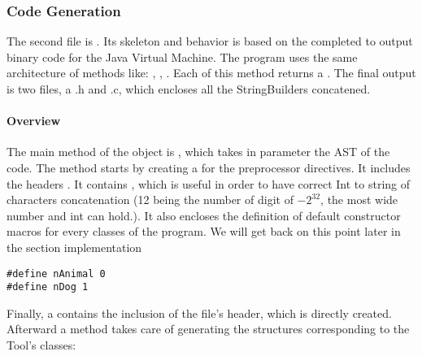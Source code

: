  \subsubsection{Code Generation}
The second file is . Its skeleton and behavior is based on the  completed
to output binary code for the Java Virtual Machine.
The program uses the same architecture of methods like: , , .
Each of this method returns a \lstset{style=customc}{\lstinline[basicstyle=\small\ttfamily]|StringBuilder|}.
\newline
The final output is two files, a .h and .c, which encloses all the StringBuilders concatened.
\newline
\paragraph{Overview}
The main method of the object
\newline
\lstset{style=customc}{\lstinline[basicstyle=\small\ttfamily]|COutputGeneration|} is
\lstset{style=customc}{\lstinline[basicstyle=\small\ttfamily]|def run(ctx: Context)(prog: Program)|}, which takes
in parameter the AST of the code. %
\newline
The method starts by creating a \lstset{style=customc}{\lstinline[basicstyle=\small\ttfamily]|StringBuilder|} for the preprocessor directives.
It includes the headers \lstset{style=customc}{\lstinline[basicstyle=\small\ttfamily]|stdio.h, string.h and stdlib.h|}.
It contains \lstset{style=customc}{\lstinline[basicstyle=\small\ttfamily]|#define INT_MAX_LENGTH 12|}, which is useful
in order to have correct Int to string of characters concatenation (12 being the number of digit of $-2^{32}$, the most wide number and int can hold.).
It also encloses the definition of default constructor macros for every classes of the program. We will get back on this point later in the section implementation
\begin{lstlisting}[caption={In the case of the example used in section 2, this would be the macros produced}, captionpos=b]
#define nAnimal 0
#define nDog 1
\end{lstlisting}
Finally, a \lstset{style=customc}{\lstinline[basicstyle=\small\ttfamily]|StringBuilder|} contains the inclusion of the file's header,
which is directly created.
\newline
Afterward a method takes care of generating the structures corresponding to the Tool's classes:
\newline
